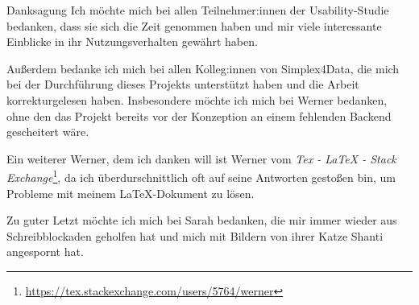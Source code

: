 \vspace*{0pt plus 1fill}
\begin{tucsimplesection}{Danksagung}
  Ich möchte mich bei allen Teilnehmer:innen der Usability-Studie bedanken, dass sie sich die Zeit genommen haben und mir viele interessante Einblicke in ihr Nutzungsverhalten gewährt haben.

  Außerdem bedanke ich mich bei allen Kolleg:innen von Simplex4Data, die mich bei der Durchführung dieses Projekts unterstützt haben und die Arbeit korrekturgelesen haben. Insbesondere möchte ich mich bei Werner bedanken, ohne den das Projekt bereits vor der Konzeption an einem fehlenden Backend gescheitert wäre.

  Ein weiterer Werner, dem ich danken will ist Werner vom \textit{Tex - LaTeX - Stack Exchange}\footnote{\url{https://tex.stackexchange.com/users/5764/werner}}, da ich überdurschnittlich oft auf seine Antworten gestoßen bin, um Probleme mit meinem \LaTeX{}-Dokument zu lösen.

  Zu guter Letzt möchte ich mich bei Sarah bedanken, die mir immer wieder aus Schreibblockaden geholfen hat und mich mit Bildern von ihrer Katze Shanti angespornt hat.
\end{tucsimplesection}
\vspace*{0pt plus 2.5fill}
